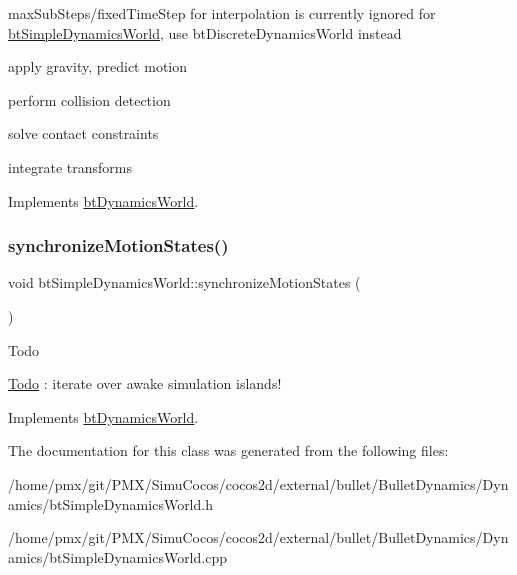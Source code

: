 max\+Sub\+Steps/fixed\+Time\+Step for interpolation is currently ignored for \hyperlink{classbtSimpleDynamicsWorld}{bt\+Simple\+Dynamics\+World}, use bt\+Discrete\+Dynamics\+World instead 

apply gravity, predict motion

perform collision detection

solve contact constraints

integrate transforms 

Implements \hyperlink{classbtDynamicsWorld_a5ab26a0d6e8b2b21fbde2ed8f8dd6294}{bt\+Dynamics\+World}.

\mbox{\label{classbtSimpleDynamicsWorld_a91e996f5ce6e465e805565ee0ba14824}} 
\subsubsection{\texorpdfstring{synchronize\+Motion\+States()}{synchronizeMotionStates()}}
{\footnotesize\ttfamily void bt\+Simple\+Dynamics\+World\+::synchronize\+Motion\+States (\begin{DoxyParamCaption}{ }\end{DoxyParamCaption})\hspace{0.3cm}{\ttfamily [virtual]}}

\begin{DoxyRefDesc}{Todo}
\item[\hyperlink{todo__todo000034}{Todo}]\+: iterate over awake simulation islands! \end{DoxyRefDesc}


Implements \hyperlink{classbtDynamicsWorld}{bt\+Dynamics\+World}.



The documentation for this class was generated from the following files\+:\begin{DoxyCompactItemize}
\item 
/home/pmx/git/\+P\+M\+X/\+Simu\+Cocos/cocos2d/external/bullet/\+Bullet\+Dynamics/\+Dynamics/bt\+Simple\+Dynamics\+World.\+h\item 
/home/pmx/git/\+P\+M\+X/\+Simu\+Cocos/cocos2d/external/bullet/\+Bullet\+Dynamics/\+Dynamics/bt\+Simple\+Dynamics\+World.\+cpp\end{DoxyCompactItemize}
